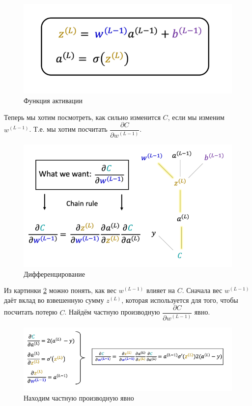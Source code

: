 \documentclass[a4paper, 10pt, openany]{book} %
\begin{document}
	\begin{figure}[h!]
		\centering
		\includegraphics[width=\linewidth]{pictures/backpropagation/sigma.png}
		\caption{Функция активации}
		\label{weighted_sum}
	\end{figure}

	Теперь мы хотим посмотреть, как сильно изменится $C$, если мы изменим $w^{(L-1)}$. Т.е. мы хотим посчитать $\dfrac{\partial C}{\partial w^{(L-1)}}$.
	
	\begin{figure}[h!]
		\centering
		\includegraphics[width=\linewidth]{pictures/backpropagation/chain_rule.png}
		\caption{Дифференцирование}
		\label{derivative_1}
	\end{figure}

	Из картинки \ref{derivative_1} можно понять, как вес $w^{(L-1)}$ влияет на $C$. Сначала вес $w^{(L-1)}$ даёт вклад во взвешенную сумму $z^{(L)}$, которая используется для того, чтобы посчитать потерю $C$. Найдём частную производную $\dfrac{\partial C}{\partial w^{(L-1)}}$ явно.
	
	\begin{figure}[h!]
		\centering
		\includegraphics[width=\linewidth]{pictures/backpropagation/derivative_itself.png}
		\caption{Находим частную производную явно}
		\label{derivative_itself_weight}
	\end{figure}
\end{document}
